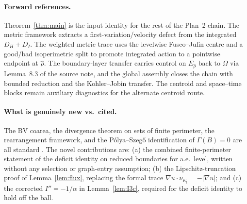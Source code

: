 \documentclass[11pt]{article}
\theoremstyle{definition}
\newcommand{\Om}{\Omega}
\begin{document}
\paragraph{Forward references.} Theorem~\ref{thm:main} is the input
identity for the rest of the Plan~2 chain. The metric framework
\cite{MetricFramework} extracts a first-variation/velocity defect from
the integrated $D_{H}+D_{I}$. The weighted metric trace
\cite{WeightedMetricTrace} uses the levelwise Fusco--Julin centre and
a good/bad isoperimetric split to promote integrated action to a
pointwise endpoint at $\widehat\rho$. The boundary-layer transfer
\cite{BoundaryLayerTransfer} carries control on $E_{\widehat\rho}$ back
to $\Om$ via Lemma~8.3 of the source note, and the global assembly
\cite{GlobalAssembly} closes the chain with bounded reduction and the
Kohler--Jobin transfer.  The centroid and space--time blocks
\cite{CentroidBound,SpaceTimeIdentity} remain auxiliary diagnostics for
the alternate centroid route.

\paragraph{What is genuinely new vs.\ cited.} The BV coarea, the
divergence theorem on sets of finite perimeter, the rearrangement
framework, and the P\'olya--Szeg\H{o} identification of $\Gamma(B)=0$
are all standard \cite{Maggi2012,AFP2000,Talenti1976,Kawohl1985,
PolyaSzego1951,Bandle1980}. The novel contributions are: (a) the
combined finite-perimeter statement of the deficit identity on reduced
boundaries for a.e.\ level, written without any selection or graph-entry
assumption; (b) the Lipschitz-truncation proof of Lemma~\ref{lem:flux},
replacing the formal trace $\nabla u\cdot\nu_{E_{t}}=-|\nabla u|$;
and (c) the corrected $I''=-1/\alpha$ in Lemma~\ref{lem:I3c}, required
for the deficit identity to hold off the ball.
\end{document}

